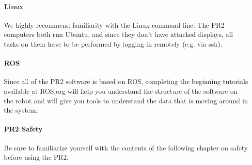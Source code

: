 \paragraph{Linux} We highly recommend familiarity with the Linux command-line.  The PR2 computers both run Ubuntu, and since they don't have attached displays, all tasks on them have to be performed by logging in remotely (e.g. via ssh).
\paragraph{ROS} Since all of the PR2 software is based on ROS, completing the beginning tutorials available at ROS.org will help you understand the structure of the software on the robot and will give you tools to understand the data that is moving around in the system.
\paragraph{PR2 Safety} Be sure to familiarize yourself with the contents of the following chapter on safety before using the PR2.
